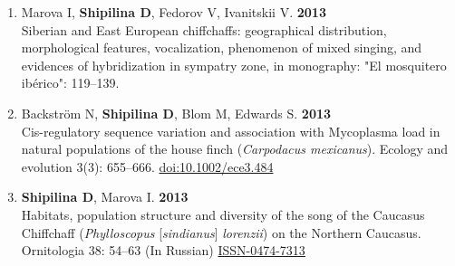 \documentclass[10pt]{article}
\begin{document}
\begin{cv}
\begin{enumerate}
	         \item  Marova I, \textbf{Shipilina D}, Fedorov V, Ivanitskii V. \textbf{2013}\\
            Siberian and East European chiffchaffs: geographical distribution, morphological features, vocalization, phenomenon of mixed singing, and evidences of hybridization in sympatry zone, in monography: "El mosquitero ib{\'e}rico": 119--139.
	\item  Backstr{\"o}m N, \textbf{Shipilina D}, Blom M, Edwards S. \textbf{2013}\\
	           Cis-regulatory sequence variation and association with Mycoplasma load in natural populations of the house finch (\textit{Carpodacus mexicanus}). Ecology and evolution 3(3): 655--666. \href{http://dx.doi.org/doi: 10.1002/ece3.484}{doi:10.1002/ece3.484}  
    

 \item \textbf{Shipilina D}, Marova I. \textbf{2013}\\
          	Habitats, population structure and diversity of the song of the Caucasus Chiffchaff (\textit{Phylloscopus} [\textit{sindianus}] \textit{lorenzii}) on the Northern Caucasus. Ornitologia 38: 54--63 (In Russian) \href{http://zmmu.msu.ru/ornithology/Vol\%2038/38_Shipilina_Marova.pdf}{ISSN-0474-7313} 
	
	


\end{enumerate}
\end{cv}
\end{document}
